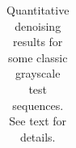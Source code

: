 \documentclass[10pt, a4paper]{article}
\newcommand{\bsic}[1]{\textcolor{black}{\textit{#1}}}
\newcommand{\Bsic}[1]{\textcolor{black}{\textbf{\textit{#1}}}}
\newcommand{\Best}[1]{\textbf{\textcolor{black}{#1}}}
\begin{document}
\begin{landscape}
\begin{table}[htp!]
\begin{center}
{\begin{tabular}{ c | l |c c | c c | c c | c c | c c | c c | c }
		\end{tabular}}
	\end{center}
	\caption{Quantitative denoising results for some classic grayscale test sequences. See text for details.}
	\label{tab:psnr-classic-gray}
\end{table}
\end{landscape}
\end{document}

